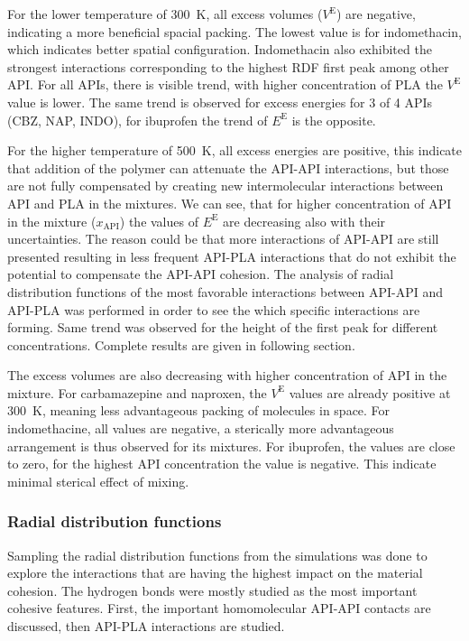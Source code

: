 \vspace{-0.2cm}
For the lower temperature of 300~K, all excess volumes ($V^\text{E}$) are negative, indicating a more beneficial spacial packing. The lowest value is for indomethacin, which indicates better spatial configuration. Indomethacin also exhibited the strongest interactions corresponding to the highest RDF first peak among other API. For all APIs, there is visible trend, with higher concentration of PLA the $V^\text{E}$ value is lower. The same trend is observed for excess energies for 3 of 4 APIs (CBZ, NAP, INDO), for ibuprofen the trend of $E^\text{E}$ is the opposite. 

For the higher temperature of 500~K, all excess energies are positive, this indicate that addition of the polymer can attenuate the API-API interactions, but those are not fully compensated by creating new intermolecular interactions between API and PLA in the mixtures. We can see, that for higher concentration of API in the mixture ($x_{\text{API}}$) the values of $E^\text{E}$ are decreasing also with their uncertainties. The reason could be that more interactions of API-API are still presented resulting in less frequent API-PLA interactions that do not exhibit the potential to compensate the API-API cohesion. The analysis of radial distribution functions of the most favorable interactions between API-API and API-PLA was performed in order to see the which specific interactions are forming. Same trend was observed for the height of the first peak for different concentrations. Complete results are given in following section.

The excess volumes are also decreasing with higher concentration of API in the mixture. For carbamazepine and naproxen, the $V^\text{E}$ values are already positive at 300~K, meaning less advantageous packing of molecules in space. For indomethacine, all values are negative, a sterically more advantageous arrangement is thus observed for its mixtures. For ibuprofen, the values are close to zero, for the highest API concentration the value is negative. This indicate minimal sterical effect of mixing. 



\vspace{-0.1cm}

\subsubsection{Radial distribution functions}
\vspace{-0.2cm}
Sampling the radial distribution functions from the simulations was done to explore the interactions that are having the highest impact on the material cohesion. The hydrogen bonds were mostly studied as the most important cohesive features. First, the important homomolecular API-API contacts are discussed, then API-PLA interactions are studied.



